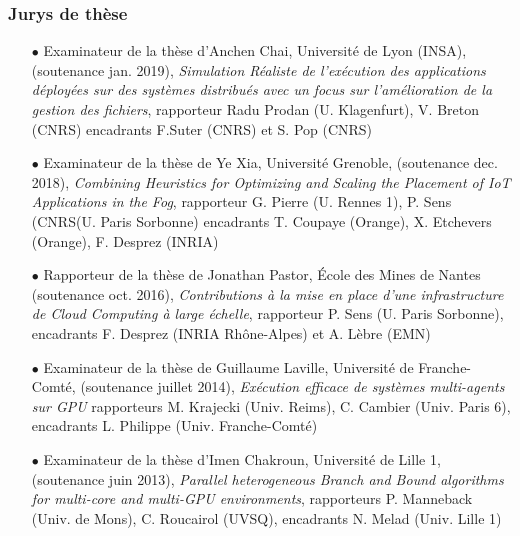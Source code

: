 \subsubsection{Jurys de thèse}

\begin{itemize}

\item[$\bullet$] 
Examinateur de la thèse d'Anchen Chai, Université de Lyon (INSA),
(soutenance jan. 2019), \textit{Simulation Réaliste de l'exécution des
  applications déployées sur des systèmes distribués avec un focus sur
  l'amélioration de la gestion des fichiers},
rapporteur Radu Prodan (U. Klagenfurt), V. Breton (CNRS) 
encadrants F.Suter (CNRS) et S. Pop (CNRS)\\


\item[$\bullet$] 
Examinateur de la thèse de Ye Xia, Université Grenoble,
(soutenance dec. 2018), \textit{Combining Heuristics for Optimizing and Scaling
  the Placement of IoT Applications in the Fog},
rapporteur G. Pierre (U. Rennes 1), P. Sens (CNRS(U. Paris Sorbonne) 
encadrants T. Coupaye (Orange), X. Etchevers (Orange), F. Desprez (INRIA)\\

\item[$\bullet$] 
Rapporteur de la thèse de Jonathan Pastor, \'Ecole des Mines de Nantes
(soutenance oct. 2016), \textit{Contributions à la mise en place d'une
  infrastructure de Cloud Computing à large échelle},
rapporteur P. Sens (U. Paris Sorbonne), 
encadrants F. Desprez (INRIA Rhône-Alpes) et A. Lèbre (EMN)\\

\item[$\bullet$]
Examinateur de la thèse de Guillaume Laville, Université de Franche-Comté,
(soutenance juillet 2014), \textit{Exécution efficace de systèmes multi-agents
  sur GPU}
rapporteurs M. Krajecki (Univ. Reims), C. Cambier (Univ. Paris 6),
encadrants L. Philippe (Univ. Franche-Comté)\\

\item[$\bullet$]
Examinateur de la thèse d'Imen Chakroun, Université de Lille 1,
(soutenance juin 2013), \textit{Parallel heterogeneous Branch and Bound algorithms for multi-core and multi-GPU environments},
rapporteurs P. Manneback (Univ. de Mons), C. Roucairol (UVSQ),
encadrants N. Melad (Univ. Lille 1)\\


\end{itemize}

